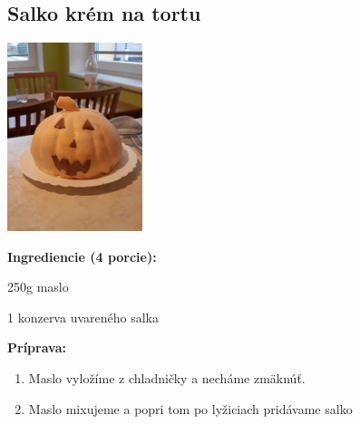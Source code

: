 \setcounter{step}{0}

\subsection{ Salko krém na tortu }

\begin{ingredient}
  
      \includegraphics[height=5.5cm]{images/pistkot_krem_salko}
  
  \def\portions{  }
  \textbf{ {\normalsize Ingrediencie (4 porcie):} }

  \begin{main}
      \item 250g maslo
      \item 1 konzerva uvareného salka
  \end{main}
  
\end{ingredient}
\begin{recipe}
\textbf{ {\normalsize Príprava:} }
\begin{enumerate}

  \item{Maslo vyložíme z chladničky a necháme zmäknúť.}
  \item{Maslo mixujeme a popri tom po lyžiciach pridávame salko}

\end{enumerate}
\end{recipe}

\begin{notes}
  
\end{notes}	
\clearpage
